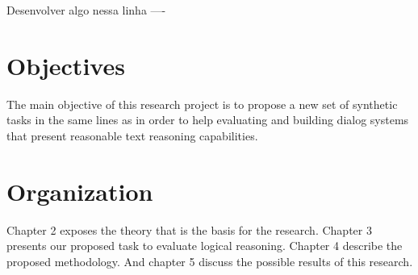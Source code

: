 Desenvolver algo nessa linha ----


\section{Objectives}
\label{sec:objectives}

The main objective of this research project is to propose a new set of synthetic tasks in the same lines as \cite{WestonBCM15} in order to help evaluating and building dialog systems that present reasonable text reasoning capabilities.


\section{Organization}
\label{sec:organization}

Chapter 2 exposes the theory that is the basis for the research. Chapter 3 presents our proposed task to evaluate logical reasoning. Chapter 4 describe the proposed methodology. And chapter 5 discuss the possible results of this research.



